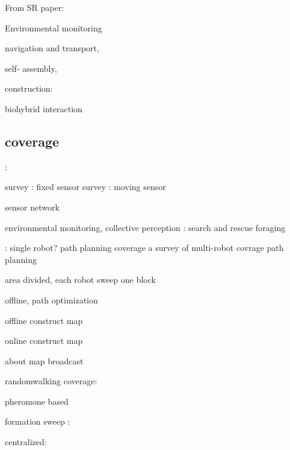 From SR paper: 

\cite{talamali2021less} Environmental monitoring 

\cite{dorigo2013swarmanoid} navigation and transport,

\cite{rubenstein2014programmable} self- assembly,

construction:

\cite{team2012designing}
\cite{petersen2019review}

biohybrid interaction 
\cite{wahby2018autonomously}
\cite{halloy2007social}

\subsection{coverage}:

\cite{wang2011coverage} survey : fixed sensor
\cite{galceran2013survey} survey : moving sensor

sensor network
\cite{luo2018adaptive}
\cite{santos2019decentralized}
\cite{siligardi2019robust}

environmental monitoring, collective perception
\cite{schmickl2006collective} : 
\cite{baxter2007multi} search and rescue
\cite{lima2017cellular} foraging

\cite{julia2012comparison} : single robot? path planning coverage
\cite{almadhoun2019survey} a survey of multi-robot covrage path planning
\cite{avellar2015multi}

area divided, each robot sweep one block
\cite{rekleitis2008efficient}
\cite{scherer2015autonomous}

offline, path optimization
\cite{nazarahari2019multi}
\cite{thabit2018multi}
\cite{yu2016optimal}

offline construct map
\cite{mirzaei2011cooperative}

online construct map
\cite{ge2005complete}
\cite{miki2018multi}

about map broadcast
\cite{marjovi2009multi}
\cite{albani2017field}

randomwalking coverage:
\cite{kegeleirs2019random}
\cite{huang2019exploration}
\cite{ichikawa1999characteristics}
\cite{mcguire2019minimal}
\cite{pang2021effect}
\cite{khaluf2018collective}
\cite{zia2017cognitive}

pheromone based
\cite{koenig2001terrain}
\cite{schroeder2017efficient}
\cite{deshpande2017robot}
\cite{maftuleac2015local}
\cite{stirling2010energy}

formation sweep :

centralized:
\cite{campbell2012review}
\cite{wang1991navigation}
\cite{din2018behavior}

